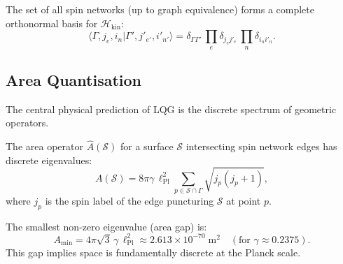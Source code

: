 \begin{theorem}
\label{thm:spin_network_basis}
The set of all spin networks (up to graph equivalence) forms a complete
orthonormal basis for $\mathcal{H}_{\mathrm{kin}}$:
\begin{equation}
\langle \Gamma, j_e, i_n | \Gamma', j'_{e'}, i'_{n'} \rangle
= \delta_{\Gamma\Gamma'}\, \prod_e \delta_{j_e j'_e}\, \prod_n
\delta_{i_n i'_n}.
\end{equation}
\end{theorem}

\subsection{Area Quantisation}
\label{sec:area_quantisation}

The central physical prediction of LQG is the discrete spectrum of
geometric operators.

\begin{theorem}
\label{thm:area_spectrum}
The area operator $\hat{A}(\mathcal{S})$ for a surface $\mathcal{S}$
intersecting spin network edges has discrete eigenvalues:
\begin{equation}
\label{eq:area_spectrum}
A(\mathcal{S}) = 8\pi \gamma\, \ell_{\mathrm{Pl}}^2
\sum_{p \in \mathcal{S} \cap \Gamma}
\sqrt{j_p(j_p + 1)},
\end{equation}
where $j_p$ is the spin label of the edge puncturing $\mathcal{S}$ at
point $p$.
\end{theorem}

\begin{proposition}
\label{prop:area_gap}
The smallest non-zero eigenvalue (area gap) is:
\begin{equation}
A_{\min} = 4\pi\sqrt{3}\, \gamma\, \ell_{\mathrm{Pl}}^2
\approx 2.613 \times 10^{-70}\;\text{m}^2
\quad (\text{for } \gamma \approx 0.2375).
\end{equation}
This gap implies space is fundamentally discrete at the Planck scale.
\end{proposition}


